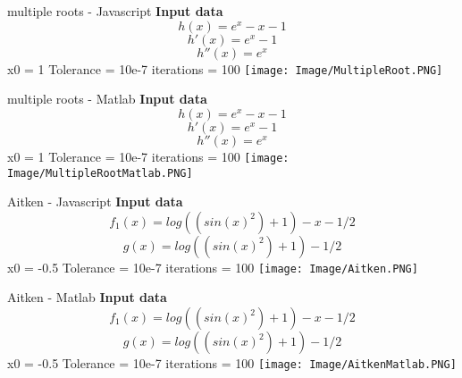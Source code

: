 \documentclass{article}
\begin{document}
\begin{section}{multiple roots - Javascript}
   \textbf{Input data}\newline
    \[h(x) = e^x-x-1\]\newline
    \[h'(x) = e^x-1\]\newline
     \[h''(x)= e^x\]\newline
    x0 = 1\newline
    Tolerance = 10e-7\newline
    iterations = 100 \newline\newline
    \texttt{[image: Image/MultipleRoot.PNG]}
\end{section}
\begin{section}{multiple roots - Matlab}
   \textbf{Input data}\newline
    \[h(x) = e^x-x-1\]\newline
    \[h'(x) = e^x-1\]\newline
     \[h''(x)= e^x\]\newline
    x0 = 1\newline
    Tolerance = 10e-7\newline
    iterations = 100 \newline\newline
    \texttt{[image: Image/MultipleRootMatlab.PNG]}
\end{section}

\begin{section}{Aitken - Javascript}
   \textbf{Input data}\newline
    \[f_{1}(x) = log((sin(x)^2)+1)-x-1/2\]\newline
    \[g(x) = log((sin(x)^2)+1)-1/2\]\newline
    x0 = -0.5\newline
    Tolerance = 10e-7\newline
    iterations = 100 \newline\newline
    \texttt{[image: Image/Aitken.PNG]}
\end{section}
\begin{section}{Aitken - Matlab}
   \textbf{Input data}\newline
    \[f_{1}(x) = log((sin(x)^2)+1)-x-1/2\]\newline
    \[g(x) = log((sin(x)^2)+1)-1/2\]\newline
    x0 = -0.5\newline
    Tolerance = 10e-7\newline
    iterations = 100 \newline\newline
    \texttt{[image: Image/AitkenMatlab.PNG]}
\end{section}
\end{document}
